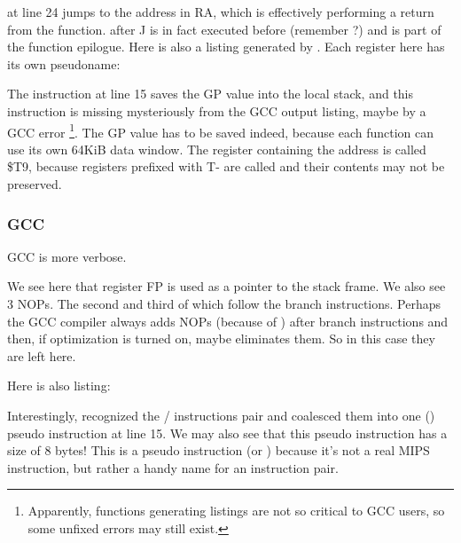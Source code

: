 
 at line 24 jumps to the address in \ac{RA}, which is effectively performing a return from the function.
 after J is in fact executed before  (remember ?) and is part of the function epilogue.
Here is also a listing generated by \IDA. Each register here has its own pseudoname:



The instruction at line 15 saves the GP value into the local stack, and this instruction is missing mysteriously from the GCC output listing, maybe by a GCC error
\footnote{Apparently, functions generating listings are not so critical to GCC users, so some unfixed errors may still exist.}.
The GP value has to be saved indeed, because each function can use its own 64KiB data window.
The register containing the \puts address is called \$T9, because registers prefixed with T- are called
 and their contents may not be preserved.

\subsubsection{\NonOptimizing GCC}

\NonOptimizing GCC is more verbose.



We see here that register FP is used as a pointer to the stack frame.
We also see 3 \ac{NOP}s.
The second and third of which follow the branch instructions.
Perhaps the GCC compiler always adds \ac{NOP}s (because of ) after branch
instructions and then, if optimization is turned on, maybe eliminates them.
So in this case they are left here.

Here is also \IDA listing:




Interestingly, \IDA recognized the / instructions pair and coalesced them into one 
 () pseudo instruction at line 15.
We may also see that this pseudo instruction has a size of 8 bytes!
This is a pseudo instruction (or ) because it's not a real MIPS instruction, but rather
a handy name for an instruction pair.

